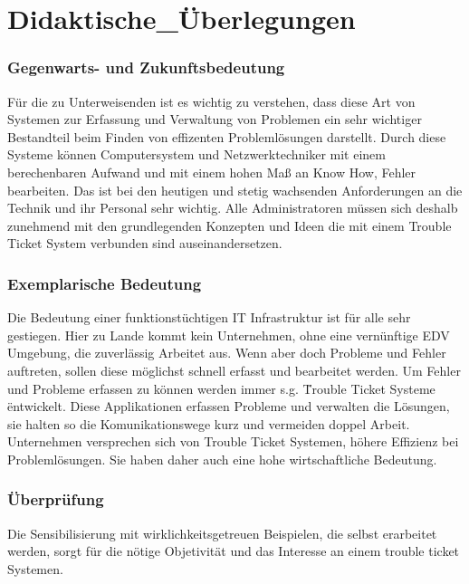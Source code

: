 \chapter{Didaktische_Überlegungen}  %
\label{chapter:Didaktische_Überlegungen}  %

\subsection{Gegenwarts- und Zukunftsbedeutung}
Für die zu Unterweisenden ist es wichtig zu verstehen, dass diese Art von Systemen zur Erfassung und Verwaltung von Problemen ein sehr wichtiger Bestandteil beim Finden von effizenten Problemlösungen darstellt. 
Durch diese Systeme können Computersystem und Netzwerktechniker mit einem berechenbaren Aufwand und mit einem hohen Maß an Know How, Fehler bearbeiten. Das ist bei den heutigen und stetig wachsenden Anforderungen an die Technik und ihr Personal sehr wichtig. Alle Administratoren müssen sich deshalb zunehmend mit den grundlegenden Konzepten und Ideen die mit einem Trouble Ticket System verbunden sind auseinandersetzen. 

\subsection{Exemplarische Bedeutung}
Die Bedeutung einer funktionstüchtigen IT Infrastruktur ist für alle sehr gestiegen. Hier zu Lande kommt kein Unternehmen, ohne eine vernünftige EDV Umgebung, die zuverlässig Arbeitet aus. Wenn aber doch Probleme und Fehler auftreten, sollen diese möglichst schnell erfasst und bearbeitet werden. 
Um Fehler und Probleme erfassen zu können werden immer s.g. \" Trouble Ticket Systeme \" entwickelt. Diese Applikationen erfassen Probleme und verwalten die Lösungen, sie halten so die Komunikationswege kurz und vermeiden doppel Arbeit. 
Unternehmen versprechen sich von Trouble Ticket Systemen, höhere Effizienz bei Problemlösungen. Sie haben daher auch eine hohe wirtschaftliche Bedeutung.


\subsection{Überprüfung}
Die Sensibilisierung mit wirklichkeitsgetreuen Beispielen, die selbst erarbeitet werden, sorgt für die nötige Objetivität und das Interesse an einem trouble ticket Systemen. 


